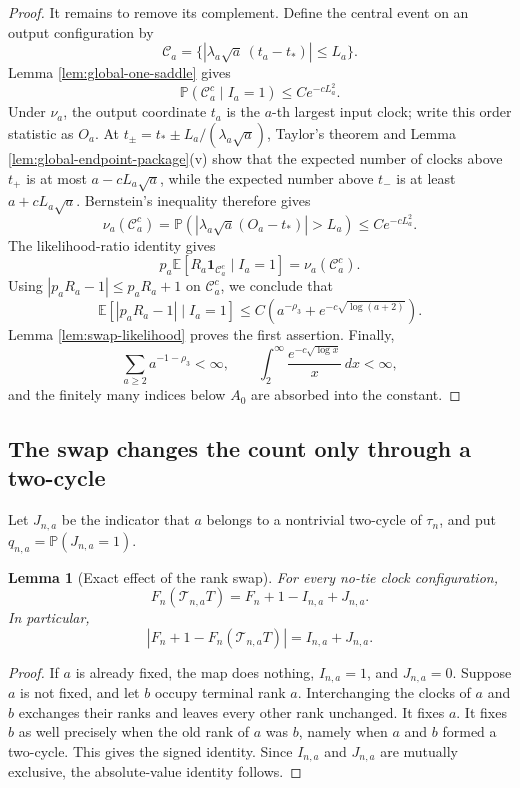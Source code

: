 \documentclass[11pt]{article}
\newtheorem{lemma}[theorem]{Lemma}
\theoremstyle{remark}
\newcommand{\Pp}{\mathbb P}
\newcommand{\Ee}{\mathbb E}
\newcommand{\one}{\mathbf 1}
\newcommand{\dd}{\,d}
\begin{document}
\begin{proof}
It remains to remove its complement.  Define the central event on an output
configuration by
\[
        \mathcal C_a=
        \{|\lambda_a\sqrt a\,(t_a-t_*)|\le L_a\}.
\]
Lemma \ref{lem:global-one-saddle} gives
\[
        \Pp(\mathcal C_a^c\mid I_a=1)
        \le Ce^{-cL_a^2}.
\]
Under $\nu_a$, the output coordinate $t_a$ is the $a$-th largest input clock;
write this order statistic as $O_a$.  At
$t_\pm=t_*\pm L_a/(\lambda_a\sqrt a)$, Taylor's theorem and Lemma
\ref{lem:global-endpoint-package}(v) show that the expected number of clocks
above $t_+$ is at most $a-cL_a\sqrt a$, while the expected number above $t_-$
is at least $a+cL_a\sqrt a$.  Bernstein's inequality therefore gives
\[
        \nu_a(\mathcal C_a^c)
        =\Pp(|\lambda_a\sqrt a(O_a-t_*)|>L_a)
        \le Ce^{-cL_a^2}.
\]
The likelihood-ratio identity gives
\[
        p_a\Ee[R_a\one_{\mathcal C_a^c}\mid I_a=1]
        =\nu_a(\mathcal C_a^c).
\]
Using $|p_aR_a-1|\le p_aR_a+1$ on $\mathcal C_a^c$, we conclude that
\[
        \Ee[|p_aR_a-1|\mid I_a=1]
        \le C\left(a^{-\rho_3}
        +e^{-c\sqrt{\log(a+2)}}\right).
\]
Lemma \ref{lem:swap-likelihood} proves the first assertion.  Finally,
\[
        \sum_{a\ge2}a^{-1-\rho_3}<\infty,
        \qquad
        \int_2^\infty\frac{e^{-c\sqrt{\log x}}}{x}\dd x<\infty,
\]
and the finitely many indices below $A_0$ are absorbed into the constant.
\end{proof}

\subsection{The swap changes the count only through a two-cycle}

Let $J_{n,a}$ be the indicator that $a$ belongs to a nontrivial two-cycle of
$\tau_n$, and put $q_{n,a}=\Pp(J_{n,a}=1)$.

\begin{lemma}[Exact effect of the rank swap]\label{lem:swap-count-effect}
For every no-tie clock configuration,
\[
        F_n(\mathcal T_{n,a}T)=F_n+1-I_{n,a}+J_{n,a}.
\]
In particular,
\[
        |F_n+1-F_n(\mathcal T_{n,a}T)|=I_{n,a}+J_{n,a}.
\]
\end{lemma}

\begin{proof}
If $a$ is already fixed, the map does nothing, $I_{n,a}=1$, and
$J_{n,a}=0$.  Suppose $a$ is not fixed, and let $b$ occupy terminal rank $a$.
Interchanging the clocks of $a$ and $b$ exchanges their ranks and leaves every
other rank unchanged.  It fixes $a$.  It fixes $b$ as well precisely when the
old rank of $a$ was $b$, namely when $a$ and $b$ formed a two-cycle.  This gives
the signed identity.  Since $I_{n,a}$ and $J_{n,a}$ are mutually exclusive,
the absolute-value identity follows.
\end{proof}
\end{document}
